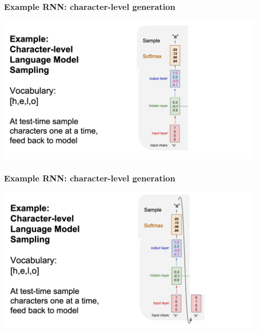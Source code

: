 \documentclass[aspectratio=1610]{beamer} %
\begin{document}
\begin{frame}

\frametitle{Example RNN: character-level generation}

\begin{center}
\includegraphics[width=\textwidth]{pics/example4}
\end{center}

\end{frame}


\begin{frame}

\frametitle{Example RNN: character-level generation}

\begin{center}
\includegraphics[width=\textwidth]{pics/example5}
\end{center}

\end{frame}
\end{document}
